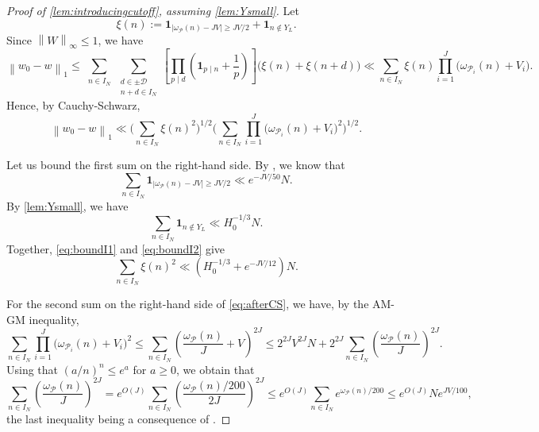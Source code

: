 \documentclass[11pt]{amsart}
\theoremstyle{definition}
\renewcommand{\leq}{\leqslant}
\renewcommand{\geq}{\geqslant}
\newcommand{\norm}[1]{\left\|#1\right\|}
\newcommand{\ind}[1]{\mathbf{1}_{#1}}
\newcommand{\N}{I_N}
\newcommand{\primes}{\mathcal{P}}
\newcommand{\D}{\mathcal{D}}
\newcommand{\curlyL}{V}
\newcommand{\elln}{L}
\newcommand{\Y}{Y_{\!\elln}}
\newcommand{\repR}{J}
\begin{document}
\begin{proof}[Proof of \cref{lem:introducingcutoff}, assuming \cref{lem:Ysmall}]
Let 
\begin{equation*}
\xi(n) := \ind{|\omega_{\primes}(n) - \repR \curlyL| \geq \repR \curlyL/2}  + \ind{n\not\in \Y}.
\end{equation*}
Since $\norm{W}_{\infty} \leq 1$, we have
\begin{equation*}
\norm{w_0-w}_1 \leq \sum_{\substack{n\in \N}}\sum_{\substack{d\in \pm\D\\ n+d \in \N}}\left[\prod_{p\mid d}\left(\ind{p\mid n}+\frac 1p\right) \right]  \big(\xi(n) +\xi(n+d)\big) \ll \sum_{n\in \N} \xi(n) \prod_{i=1}^{\repR}\big(\omega_{\primes_i}(n) + \curlyL_i\big).
\end{equation*}
Hence, by Cauchy-Schwarz,
\begin{equation}
\label{eq:afterCS}
\norm{w_0-w}_1 \ll \Bigg(\sum_{n\in \N} \xi(n)^2\Bigg)^{1/2}  \Bigg(\sum_{n\in \N} \prod_{i=1}^{\repR}\big(\omega_{\primes_i}(n) + \curlyL_i\big)^2\Bigg)^{1/2}.
\end{equation}

Let us bound the first sum on the right-hand side. By \cite[Eq.~(1.11)]{restrictedprimes}, we know that 
\begin{equation}
\label{eq:boundI1}
\sum_{n\in \N} \ind{|\omega_{\primes}(n) - \repR \curlyL| \geq \repR \curlyL/2} \ll e^{-\repR \curlyL/50}N.
\end{equation}
By \cref{lem:Ysmall}, we have 
\begin{equation}
\label{eq:boundI2}
\sum_{n\in \N} \ind{n\not\in \Y} \ll H_0^{-1/3} N.
\end{equation}
Together, \cref{eq:boundI1} and \cref{eq:boundI2} give
\begin{equation*}
\sum_{n\in \N}\xi(n)^2 \ll \left(H_0^{-1/3} + e^{-\repR \curlyL/12}\right)N.
\end{equation*} 

For the second sum on the right-hand side of \cref{eq:afterCS}, we have, by the AM-GM inequality, 
\begin{equation*}
\sum_{n\in \N} \prod_{i=1}^{\repR}\big(\omega_{\primes_i}(n) + \curlyL_i\big)^2 \leq  \sum_{n\in \N} \left(\frac{\omega_{\primes}(n)}{\repR} + \curlyL\right)^{2\repR} \leq 2^{2\repR} \curlyL^{2\repR} N +2^{2\repR} \sum_{n\in \N} \left(\frac{\omega_{\primes}(n)}{\repR}\right)^{2\repR}.
\end{equation*}
Using that $(a/n)^n \leq e^a$ for $a\geq 0$, we obtain that
\begin{equation*}
\sum_{n\in \N} \left(\frac{\omega_{\primes}(n)}{\repR}\right)^{2\repR} = e^{O(\repR)} \sum_{n\in \N} \left(\frac{\omega_{\primes}(n)/200}{2\repR}\right)^{2\repR} \leq e^{O(\repR)} \sum_{n\in \N}e^{\omega_{\primes}(n)/200} \leq  e^{O(\repR)} N e^{\repR\curlyL/100},
\end{equation*}
the last inequality being a consequence of \cite[Lemma~(3.10)]{restrictedprimes}.


\end{proof}
\end{document}
